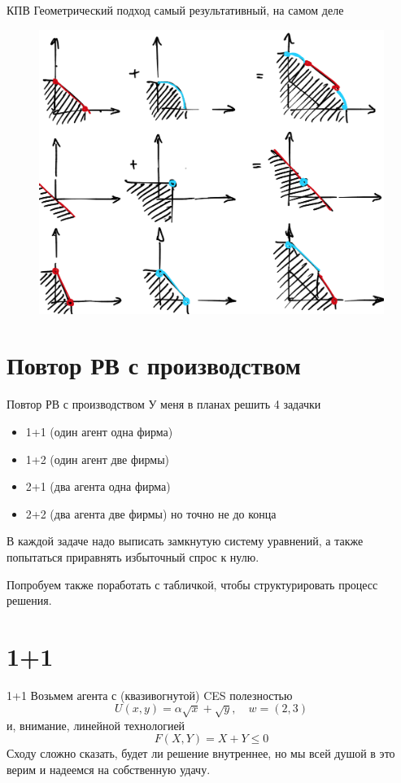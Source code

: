 \documentclass{beamer}
\begin{document}
\begin{frame}{КПВ}
Геометрический подход самый результативный, на самом деле
\begin{figure}[hbt]
\centering
\includegraphics[width=.75 \textwidth]{pic6.png}
\end{figure}
\end{frame}

\section{Повтор РВ с производством}

\begin{frame}{Повтор РВ с производством}
У меня в планах решить 4 задачки
\begin{itemize}
  \item 1+1 (один агент одна фирма)
  \item 1+2 (один агент две фирмы)
  \item 2+1 (два агента одна фирма)
  \item 2+2 (два агента две фирмы) но точно не до конца
\end{itemize}
В каждой задаче надо выписать замкнутую систему уравнений, а также попытаться приравнять избыточный спрос к нулю.

Попробуем также поработать с табличкой, чтобы структурировать процесс решения.
\end{frame}

\section{1+1}

\begin{frame}{1+1}
Возьмем агента с (квазивогнутой) CES полезностью
$$ U(x,y) = \alpha \sqrt{x} + \sqrt{y}, \quad w = (2,3)$$
и, внимание, \alert{линейной} технологией
$$ F(X,Y) = X + Y \leqslant 0$$
Сходу сложно сказать, будет ли решение внутреннее, но мы всей душой в это верим и надеемся на собственную удачу.
\end{frame}
\end{document}
